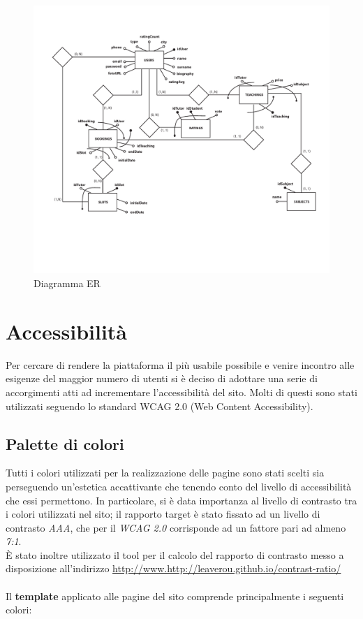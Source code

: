 \documentclass[12pt]{article}
\begin{document}
\begin{figure}[H]
	\centering
	\includegraphics[width=\textwidth]{../../interni_statici/ER.pdf}
	\caption{Diagramma ER}
	\label{fig:er}
\end{figure}


\pagebreak
\section{Accessibilità}
Per cercare di rendere la piattaforma il pi\`u usabile possibile e venire incontro alle esigenze del maggior numero di utenti si \`e deciso di adottare una serie di accorgimenti atti ad incrementare l'accessibilit\`a del sito. Molti di questi sono stati utilizzati seguendo lo standard WCAG 2.0 (Web Content Accessibility).

\subsection{Palette di colori}
Tutti i colori utilizzati per la realizzazione delle pagine sono stati scelti sia perseguendo un'estetica accattivante che tenendo conto del livello di accessibilità che essi permettono. In particolare, si \`e data importanza al livello di contrasto tra i colori utilizzati nel sito; il rapporto target \`e stato fissato ad un livello di contrasto \emph{AAA}, che per il \emph{WCAG 2.0} corrisponde ad un fattore pari ad almeno \emph{7:1}.\\
\`E stato inoltre utilizzato il tool per il calcolo del rapporto di contrasto messo a disposizione all'indirizzo \url{http://www.http://leaverou.github.io/contrast-ratio/}\\\\
Il \textbf{template} applicato alle pagine del sito comprende principalmente i seguenti colori:
\end{document}
